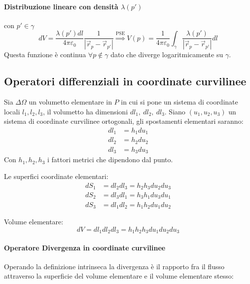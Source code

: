 \paragraph{Distribuzione lineare con densità $\lambda(p')$}
con $p'\in\gamma$ 
$$
dV = \frac{\lambda(p')dl}{4\pi\varepsilon_0}\frac{1}{|\vec{r}_p-\vec{r}_{p'}|} 
\stackrel{\text{PSE}}{\Rightarrow} V(p) = \frac{1}{4\pi\varepsilon_0} 
\int_\gamma \frac{\lambda(p')}{|\vec{r}_p-\vec{r}_{p'}|}dl
$$
Questa funzione è continua $\forall p \notin \gamma $ dato che diverge logaritmicamente su $\gamma$.

\subsection{Operatori differenziali in coordinate curvilinee}
Sia $\Delta\Omega$ un volumetto elementare in $P$ in cui si pone un sistema di coordinate
locali $l_1,l_2,l_3$, il volumetto ha dimensioni $dl_1,\ dl_2,\ dl_3$.
Siano $(u_1,u_2,u_3)$ un sistema di coordinate curvilinee ortogonali, 
gli spostamenti elementari saranno:
\begin{align*}
dl_1 &= h_1du_1\\
dl_2 &= h_2du_2\\
dl_3 &= h_3du_3
\end{align*}
Con $h_1,h_2,h_3$ i fattori metrici che dipendono dal punto.

Le superfici coordinate elementari:
\begin{align*}
dS_1 &= dl_2dl_3 = h_2h_3du_2du_3\\
dS_2 &= dl_3dl_1 = h_3h_1du_3du_1\\
dS_3 &= dl_1dl_2 = h_1h_2du_1du_2
\end{align*}

Volume elementare:
$$
dV = dl_1dl_2dl_3 = h_1h_2h_3du_1du_2du_3
$$

\paragraph{Operatore Divergenza in coordinate curvilinee}
Operando la definizione intrinseca la divergenza è il rapporto fra il flusso attraverso la 
superficie del volume elementare e il volume elementare stesso:

